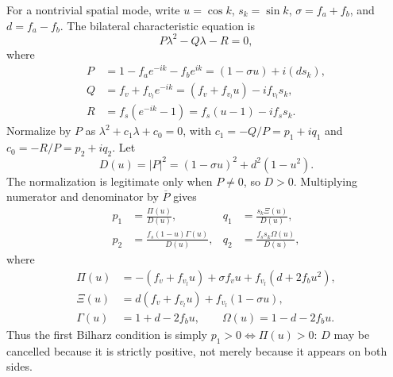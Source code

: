 \documentclass[11pt,a4paper,openany]{book}
\numberwithin{equation}{chapter}
\numberwithin{figure}{chapter}
\numberwithin{table}{chapter}
\begin{document}
For a nontrivial spatial mode, write $u=\cos k$, $s_k=\sin k$, $\sigma=f_a+f_b$, and $d=f_a-f_b$. The bilateral characteristic equation is
\begin{equation}
P\lambda^2-Q\lambda-R=0,
\end{equation}
where
\begin{align}
P&=1-f_ae^{-ik}-f_be^{ik}=(1-\sigma u)+i(ds_k),\\
Q&=f_v+f_{v_l}e^{-ik}=(f_v+f_{v_l}u)-if_{v_l}s_k,\\
R&=f_s(e^{-ik}-1)=f_s(u-1)-if_ss_k.
\end{align}
Normalize by $P$ as $\lambda^2+c_1\lambda+c_0=0$, with $c_1=-Q/P=p_1+iq_1$ and $c_0=-R/P=p_2+iq_2$. Let
\begin{equation}
D(u)=|P|^2=(1-\sigma u)^2+d^2(1-u^2).
\end{equation}
The normalization is legitimate only when $P\ne0$, so $D>0$. Multiplying numerator and denominator by $\overline P$ gives
\begin{align}
p_1&=\frac{\Pi(u)}{D(u)},&q_1&=\frac{s_k\Xi(u)}{D(u)},\\
p_2&=\frac{f_s(1-u)\Gamma(u)}{D(u)},&q_2&=\frac{f_ss_k\Omega(u)}{D(u)},
\label{eq:bilateral-components}
\end{align}
where
\begin{align}
\Pi(u)&=-(f_v+f_{v_l}u)+\sigma f_vu+f_{v_l}(d+2f_bu^2),\\
\Xi(u)&=d(f_v+f_{v_l}u)+f_{v_l}(1-\sigma u),\\
\Gamma(u)&=1+d-2f_bu,\qquad \Omega(u)=1-d-2f_bu.
\end{align}
Thus the first Bilharz condition is simply $p_1>0\Leftrightarrow\Pi(u)>0$: $D$ may be cancelled because it is strictly positive, not merely because it appears on both sides.
\end{document}
